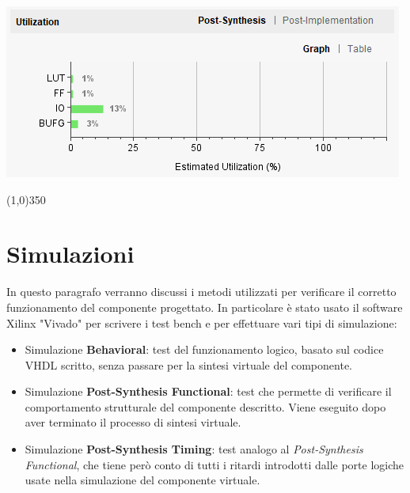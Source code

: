 \documentclass{article}
\begin{document}
\begin{center}
\includegraphics[scale=0.8]{postSynthesisUtilization} \\
\end{center}


\bigskip
\bigskip

\begin{center}
\line(1,0){350}
\end{center}

\newpage

\section{Simulazioni}

In questo paragrafo verranno discussi i metodi utilizzati per verificare il corretto funzionamento del componente progettato. In particolare è stato usato il software Xilinx "Vivado" per scrivere i test bench e per effettuare vari tipi di simulazione:

\begin{itemize}

\item Simulazione \textbf{Behavioral}: test del funzionamento logico, basato sul codice VHDL scritto, senza passare per la sintesi virtuale del componente.

\item Simulazione \textbf{Post-Synthesis Functional}: test che permette di verificare il comportamento strutturale del componente descritto. Viene eseguito dopo aver terminato il processo di sintesi virtuale.

\item Simulazione \textbf{Post-Synthesis Timing}: test analogo al \textit{Post-Synthesis Functional}, che tiene però conto di tutti i ritardi introdotti dalle porte logiche usate nella simulazione del componente virtuale.

\end{itemize}
\end{document}
